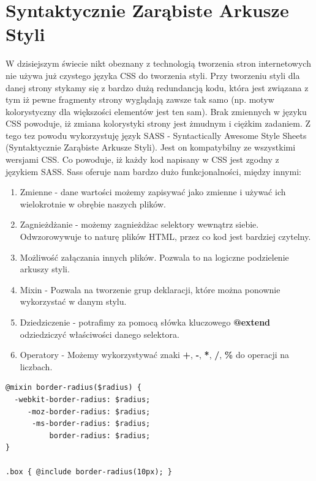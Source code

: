 \section{Syntaktycznie Zarąbiste Arkusze Styli}

W dzisiejszym świecie nikt obeznany z technologią tworzenia stron internetowych nie używa już czystego języka CSS do tworzenia styli. Przy tworzeniu styli dla danej strony stykamy się z bardzo dużą redundancją kodu, która jest związana z tym iż pewne fragmenty strony wyglądają zawsze tak samo (np. motyw kolorystyczny dla większości elementów jest ten sam). Brak zmiennych w języku CSS powoduje, iż zmiana kolorystyki strony jest żmudnym i ciężkim zadaniem.
Z tego tez powodu wykorzystuję język SASS - Syntactically Awesome Style Sheets (Syntaktycznie Zarąbiste Arkusze Styli)\cite{Sass}. Jest on kompatybilny ze wszystkimi wersjami CSS. Co powoduje, iż każdy kod napisany w CSS jest zgodny z językiem SASS. 
Sass oferuje nam bardzo dużo funkcjonalności, między innymi:
\begin{enumerate}
	\item Zmienne - dane wartości możemy zapisywać jako zmienne i używać ich wielokrotnie w obrębie naszych plików.
	\item Zagnieżdżanie - możemy zagnieżdżac selektory wewnątrz siebie. Odwzorowywuje to naturę plików HTML, przez co kod jest bardziej czytelny.
	\item Możliwość załączania innych plików. Pozwala to na logiczne podzielenie arkuszy styli.
	\item Mixin - Pozwala na tworzenie grup deklaracji, które można ponownie wykorzystać w danym stylu.
	\item Dziedziczenie - potrafimy za pomocą słówka kluczowego \textbf{@extend} odziedziczyć właściwości danego selektora.
	\item Operatory - Możemy wykorzystywać znaki \textbf{+}, \textbf{-}, \textbf{*}, \textbf{/}, \textbf{\%} do operacji na liczbach.
\end{enumerate}


\begin{lstlisting}[frame=single, numbers=none,captionpos=b, 
caption={Przykładowy kod SCSS wykorzystujący mixin}]
@mixin border-radius($radius) {
  -webkit-border-radius: $radius;
     -moz-border-radius: $radius;
      -ms-border-radius: $radius;
          border-radius: $radius;
}

.box { @include border-radius(10px); }
\end{lstlisting}

